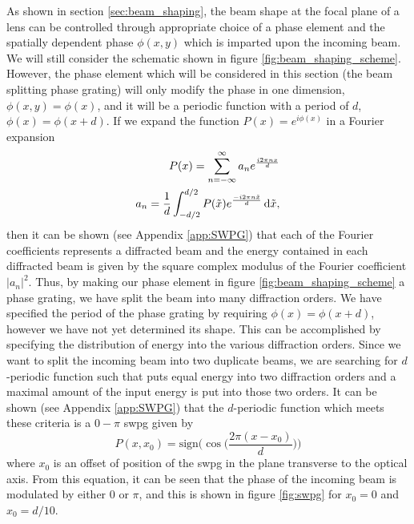As shown in section \ref{sec:beam_shaping}, the beam shape at the focal plane of a lens can be controlled through appropriate choice of a phase element and the spatially dependent phase $\phi(x,y)$ which is imparted upon the incoming beam.  We will still consider the schematic shown in figure \ref{fig:beam_shaping_scheme}.  However, the phase element which will be considered in this section (the beam splitting phase grating) will only modify the phase in one dimension, $\phi(x,y)=\phi(x)$, and it will be a periodic function with a period of $d$, $\phi(x)=\phi(x+d)$. If we expand the function $P(x)=e^{i\phi(x)}$ in a Fourier expansion
\begin{align}
\label{eqn:Fourier_coeff_def}
	P(x) = \sum_{n=-\infty}^{\infty}a_n e^{\frac{i2\pi n x }{d}}\\
	a_n = \frac{1}{d}\int_{-d/2}^{d/2} P(\tilde{x})e^{\frac{-i2\pi n\tilde{x}}{d}}\mathop{}\!\mathrm{d}\tilde{x},
\end{align}
then it can be shown (see Appendix \ref{app:SWPG}) that each of the Fourier coefficients represents a diffracted beam and the energy contained in each diffracted beam is given by the square complex modulus of the Fourier coefficient $\rvert a_n\rvert^2$.  Thus, by making our phase element in figure \ref{fig:beam_shaping_scheme} a phase grating, we have split the beam into many diffraction orders.  We have specified the period of the phase grating by requiring $\phi(x)=\phi(x+d)$, however we have not yet determined its shape.  This can be accomplished by specifying the distribution of energy into the various diffraction orders.  Since we want to split the incoming beam into two duplicate beams, we are searching for $d$-periodic function such that puts equal energy into two diffraction orders and a maximal amount of the input energy is put into those two orders. It can be shown (see Appendix \ref{app:SWPG}) that the $d$-periodic function which meets these criteria is a $0-\pi$ \gls{swpg} given by
\begin{equation}
\label{eqn:swpg}
	P(x,x_0) = \mathrm{sign}\Bigg( \cos\bigg( \frac{2\pi(x-x_0)}{d}\bigg)\Bigg)
\end{equation} 
where $x_0$ is an offset of position of the \gls{swpg} in the plane transverse to the optical axis. From this equation, it can be seen that the phase of the incoming beam is modulated by either $0$ or $\pi$, and this is shown in figure \ref{fig:swpg} for $x_0=0$ and $x_0=d/10$.

